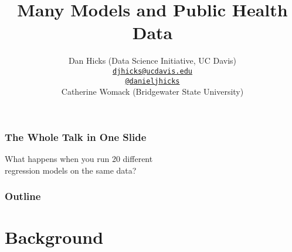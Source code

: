 \documentclass{philslides}
\newcommand{\talkurl}{\href{}{}}
\begin{document}
\date{}
\title{Many Models and Public Health Data}
\author[Dan Hicks]{
	Dan Hicks (Data Science Initiative, UC Davis)\\
	{\scriptsize \href{mailto:djhicks@ucdavis.edu}{\texttt{djhicks@ucdavis.edu}}}\\ 
	{\scriptsize \href{https://twitter.com/danieljhicks}{\texttt{@danieljhicks}}}\\
	Catherine Womack (Bridgewater State University)
	}
	
\frame
{
	\titlepage
}

\frame
{
	\frametitle{The Whole Talk in One Slide}
	\begin{center}
	\parbox{.67\textwidth}{
		What happens when you run 20 different\\ regression models on the same data?  
	}
	\end{center}
}


\frame
{
	\frametitle{Outline}
	\tableofcontents
}


\section{Background}
\subsection{}
\end{document}
